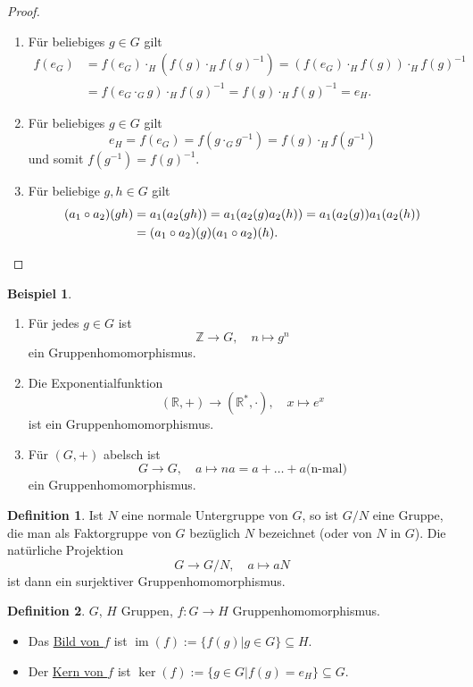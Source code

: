 \documentclass[12pt]{scrartcl} %
\DeclareMathOperator{\im}{im}
\theoremstyle{definition}
\newtheorem*{defn}{Definition}
\newtheorem{ex}{Beispiel}
\theoremstyle{remark}
\newcommand{\defi}{\underline}
\begin{document}
\begin{proof}
	\begin{enumerate}
	\item Für beliebiges \(g \in G\) gilt
		\begin{align*}
			f(e_G) &= f(e_G)\cdot_H(f(g)\cdot_Hf(g)^{-1}) = (f(e_G)\cdot_Hf(g))\cdot_Hf(g)^{-1}\\
			&= f(e_G\cdot_Gg)\cdot_Hf(g)^{-1} = f(g)\cdot_Hf(g)^{-1} = e_H.
		\end{align*}
	\item Für beliebiges \(g \in G\) gilt \[e_H=f(e_G)=f(g\cdot_G g^{-1})=f(g)\cdot_{H}f(g^{-1})\] und somit \(f(g^{-1})=f(g)^{-1}\).
	\item Für beliebige \(g, h \in G\) gilt
		\begin{align*}
			(a_1\circ a_2)(gh) &= a_1(a_2(gh)) = a_1(a_2(g)a_2(h)) = a_1(a_2(g))a_1(a_2(h))\\
			&= (a_1\circ a_2)(g)(a_1\circ a_2)(h).\qedhere
		\end{align*}
	\end{enumerate}
\end{proof}

\begin{ex}
	\begin{enumerate}
	\item Für jedes $g \in G$ ist
		$$\mathbb{Z} \rightarrow G, \quad n \mapsto g^n$$
		ein Gruppenhomomorphismus.
	\item Die Exponentialfunktion
		$$(\mathbb{R},+)\rightarrow(\mathbb{R}^*,\cdot), \quad x\mapsto e^x$$
		ist ein Gruppenhomomorphismus.
	\item Für $(G,+)$ abelsch ist
		$$G\rightarrow G, \quad a\mapsto na = a+\dots+a \text{(n-mal)}$$
		ein Gruppenhomomorphismus.
	\end{enumerate}
\end{ex}

\begin{defn}
	Ist $N$ eine normale Untergruppe von $G$, so ist $G/N$ eine Gruppe, die man als Faktorgruppe von $G$ bezüglich $N$ bezeichnet (oder von $N$ in $G$).
	Die natürliche Projektion $$G\rightarrow G/N, \quad a\mapsto aN$$ ist dann ein surjektiver Gruppenhomomorphismus.
\end{defn}

\begin{defn}
	$G$, $H$ Gruppen, $f: G \rightarrow H$ Gruppenhomomorphismus.
	\begin{itemize}
	\item Das \defi{Bild von $f$} ist $\im(f) := \{f(g) | g \in G\} \subseteq H$.
	\item Der \defi{Kern von $f$} ist $\ker(f) := \{g \in G | f(g) = e_H\} \subseteq G$.
	\end{itemize}
\end{defn}
\end{document}
